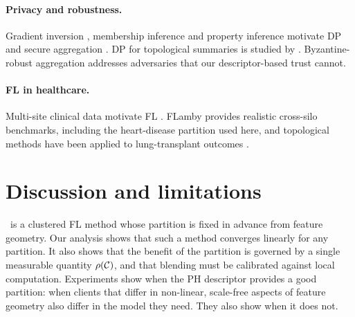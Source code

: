 \paragraph{Privacy and robustness.}
Gradient inversion \citep{zhu2019deep,geiping2020inverting}, membership inference
\citep{yeom2018privacy} and property inference \citep{melis2019exploiting} motivate DP
\citep{dwork2014algorithmic,abadi2016deep,wei2020federated} and secure aggregation
\citep{bonawitz2017practical}. DP for topological summaries is studied by
\citet{kang2024differentially}. Byzantine-robust aggregation
\citep{blanchard2017machine,yin2018byzantine} addresses adversaries that our descriptor-based
trust cannot.

\paragraph{FL in healthcare.}
Multi-site clinical data motivate FL \citep{rieke2020future}. FLamby
\citep{terrail2022flamby} provides realistic cross-silo benchmarks, including the
heart-disease partition used here, and topological methods have been applied to
lung-transplant outcomes \citep{tran2025topoattention}.

\section{Discussion and limitations}
\label{sec:discussion}

\ptopofl\ is a clustered FL method whose partition is fixed in advance from feature
geometry. Our analysis shows that such a method converges linearly for any partition. It
also shows that the benefit of the partition is governed by a single measurable quantity
$\rho(\mathcal{C})$, and that blending must be calibrated against local computation. Experiments
show when the PH descriptor provides a good partition: when clients that differ in
non-linear, scale-free aspects of feature geometry also differ in the model they need. They
also show when it does not.

